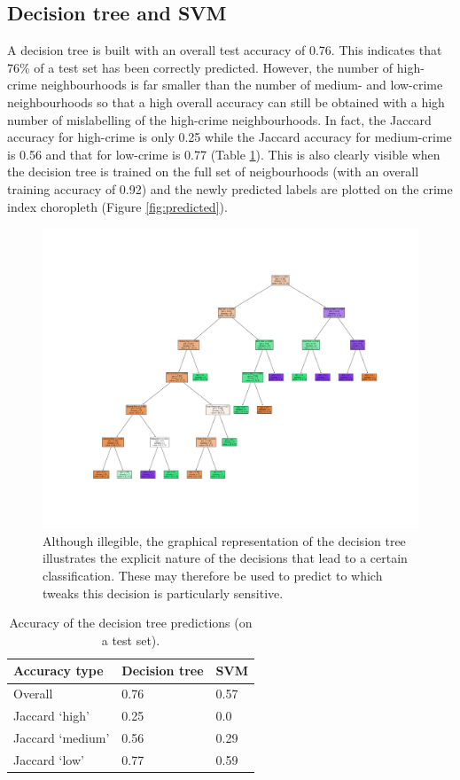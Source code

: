 \documentclass{article}
\begin{document}
\subsection{Decision tree and SVM}
A decision tree is built with an overall test accuracy of 0.76. This indicates that 76\% of a test set has been correctly predicted. However, the number of high-crime neighbourhoods is far smaller than the number of medium- and low-crime neighbourhoods so that a high overall accuracy can still be obtained with a high number of mislabelling of the high-crime neighbourhoods. In fact, the Jaccard accuracy for high-crime is only 0.25 while the Jaccard accuracy for medium-crime is 0.56 and that for low-crime is 0.77 (Table \ref{tab:accuracy}). This is also clearly visible when the decision tree is trained on the full set of neigbourhoods (with an overall training accuracy of 0.92) and the newly predicted labels are plotted on the crime index choropleth (Figure \ref{fig:predicted}).
\begin{figure}[ht]
\centering
 \includegraphics[width=\textwidth]{pics/decision_tree.png}
 \caption{Although illegible, the graphical representation of the decision tree illustrates the explicit nature of the decisions that lead to a certain classification. These may therefore be used to predict to which tweaks this decision is particularly sensitive.}\label{fig:tree}
\end{figure}
\begin{table}
\centering
\begin{tabular}{lll}
 \hline\hline
 Accuracy type & Decision tree & SVM\\
 \hline
 Overall & 0.76 & 0.57\\
 Jaccard `high' & 0.25 & 0.0\\
 Jaccard `medium' & 0.56 & 0.29\\
 Jaccard `low' & 0.77 & 0.59\\
 \hline
\end{tabular}\caption{Accuracy of the decision tree predictions (on a test set).}\label{tab:accuracy}
\end{table}
\end{document}
